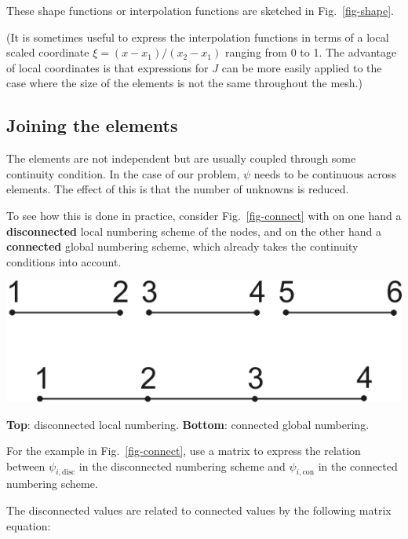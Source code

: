 These shape functions or interpolation functions are sketched in Fig.~\ref{fig-shape}.

(It is sometimes useful to express the interpolation functions in terms of a local scaled coordinate $\xi=(x-x_1)/(x_2-x_1)$ ranging from 0 to 1. The advantage of local coordinates is that expressions for $J$ can be more easily applied to the case where the size of the elements is not the same throughout the mesh.)

\subsection{Joining the elements}

The elements are not independent but are usually coupled through some continuity condition. In the case of our problem, $\psi$ needs to be continuous across elements. The effect of this is that the number of unknowns is reduced.

To see how this is done in practice, consider Fig.~\ref{fig-connect}  with on one hand a \textbf{disconnected} local numbering scheme of the nodes, and on the other hand a \textbf{connected} global numbering scheme, which already takes the continuity conditions into account.

\begin{marginfigure}
\centering
\includegraphics{numeric/figures/connect}
\caption{\textbf{Top}: disconnected local numbering. \textbf{Bottom}: connected global numbering.}
\label{fig-connect}
\end{marginfigure}

\begin{cue}
For the example in Fig.~\ref{fig-connect}, use a matrix to express the relation between $\psi_{i, \mathrm{disc}}$ in the disconnected numbering scheme and  $\psi_{i, \mathrm{con}}$ in the connected numbering scheme.
\end{cue}
  
The disconnected values are related to connected values by the following matrix equation:

